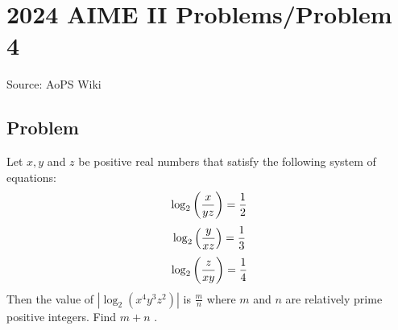 \documentclass[12pt]{article}
\begin{document}
\section*{{2024 AIME II Problems/Problem 4}}
Source: AoPS Wiki

\subsection*{Problem}
Let $x,y$ and $z$ be positive real numbers that satisfy the following system of equations: \[\log_2\left({x \over yz}\right) = {1 \over 2}\] \[\log_2\left({y \over xz}\right) = {1 \over 3}\] \[\log_2\left({z \over xy}\right) = {1 \over 4}\] Then the value of $\left|\log_2(x^4y^3z^2)\right|$ is $\tfrac{m}{n}$ where $m$ and $n$ are relatively prime positive integers. Find $m+n$ .
\end{document}
